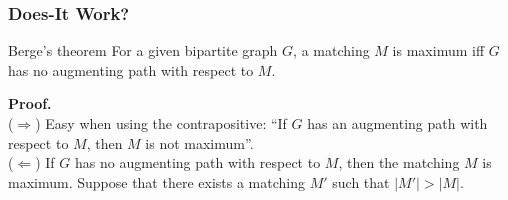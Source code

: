 \documentclass{beamer}
\begin{document}
\begin{frame}%
\frametitle{Does-It Work?}
\scriptsize
\begin{block}{Berge's theorem}
For a given bipartite graph $G$, a matching $M$ is maximum iff $G$ has no augmenting path with respect to $M$.
\end{block}
\textbf{Proof.}\\
($\Rightarrow$)  Easy when using the contrapositive: ``If $G$ has an augmenting path with respect to $M$, then $M$ is not maximum''.\\
\vspace{0.3cm}
($\Leftarrow$) If $G$ has no augmenting path with respect to $M$, then the matching $M$ is maximum.
 Suppose that there exists a matching $M'$ such that $|M'| > |M|$.


\end{frame}
\end{document}

